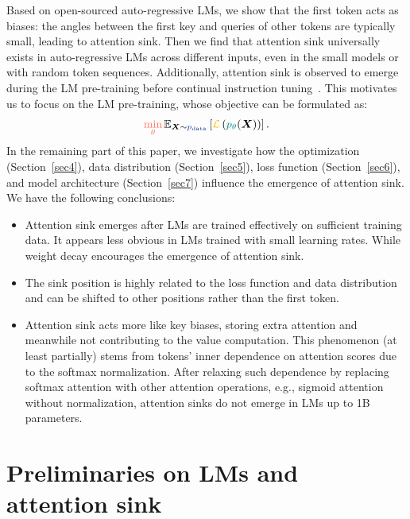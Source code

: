 \documentclass{article} \usepackage{iclr2025_conference,times}
\begin{document}
Based on open-sourced auto-regressive LMs, we show that the first token acts as biases: the angles between the first key and queries of other tokens are typically small, leading to attention sink. Then we find that attention sink universally exists in auto-regressive LMs across different inputs, even in the small models or with random token sequences. Additionally, attention sink is observed to emerge during the LM pre-training before continual instruction tuning~\citep{ouyang2022training}. This motivates us to focus on the LM pre-training, whose objective can be formulated as:
\begin{equation}
{\color{cc1}\min_{\theta}}\hspace{0.05cm}\mathbb{E}_{{\boldsymbol{X}\sim\color{cc2} p_{\textrm{data}}}}\left[{\color{cc3}\mathcal{L}}\left({\color{cc4}p_{\theta}}(\boldsymbol{X})\right)\right]\textrm{.}
\end{equation}
In the remaining part of this paper, we investigate how the {\color{cc1}optimization} (Section~\ref{sec4}), {\color{cc2}data distribution} (Section~\ref{sec5}), {\color{cc3}loss function} (Section~\ref{sec6}), and {\color{cc4}model architecture} (Section~\ref{sec7}) influence the emergence of attention sink. We have the following conclusions: 
\begin{itemize}
    \item Attention sink emerges after LMs are trained effectively on sufficient training data. It appears less obvious in LMs trained with small learning rates. While weight decay encourages the emergence of attention sink. 
    \item The sink position is highly related to the loss function and data distribution and can be shifted to other positions rather than the first token.  
    \item Attention sink acts more like key biases, storing extra attention and meanwhile not contributing to the value computation. This phenomenon (at least partially) stems from tokens' inner dependence on attention scores due to the softmax normalization. After relaxing such dependence by replacing softmax attention with other attention operations, e.g., sigmoid attention without normalization, attention sinks do not emerge in LMs up to 1B parameters.
\end{itemize}
 


%
 

\vspace{-0.25cm}
\section{Preliminaries on LMs and attention sink}
\vspace{-0.15cm}
\end{document}

